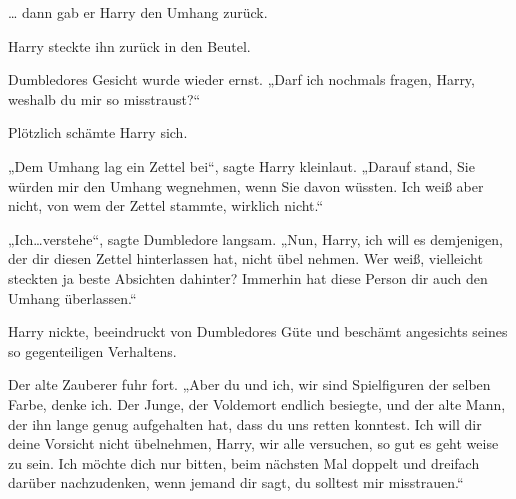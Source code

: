 … dann gab er Harry den Umhang zurück.

Harry steckte ihn zurück in den Beutel.

Dumbledores Gesicht wurde wieder ernst. „Darf ich nochmals fragen, Harry, weshalb du mir so misstraust?“

Plötzlich schämte Harry sich.

„Dem Umhang lag ein Zettel bei“, sagte Harry kleinlaut. „Darauf stand, Sie würden mir den Umhang wegnehmen, wenn Sie davon wüssten. Ich weiß aber nicht, von wem der Zettel stammte, wirklich nicht.“

„Ich…verstehe“, sagte Dumbledore langsam. „Nun, Harry, ich will es demjenigen, der dir diesen Zettel hinterlassen hat, nicht übel nehmen. Wer weiß, vielleicht steckten ja beste Absichten dahinter? Immerhin hat diese Person dir auch den Umhang überlassen.“

Harry nickte, beeindruckt von Dumbledores Güte und beschämt angesichts seines so gegenteiligen Verhaltens.

Der alte Zauberer fuhr fort. „Aber du und ich, wir sind Spielfiguren der selben Farbe, denke ich. Der Junge, der Voldemort endlich besiegte, und der alte Mann, der ihn lange genug aufgehalten hat, dass du uns retten konntest. Ich will dir deine Vorsicht nicht übelnehmen, Harry, wir alle versuchen, so gut es geht weise zu sein. Ich möchte dich nur bitten, beim nächsten Mal doppelt und dreifach darüber nachzudenken, wenn jemand dir sagt, du solltest mir misstrauen.“

